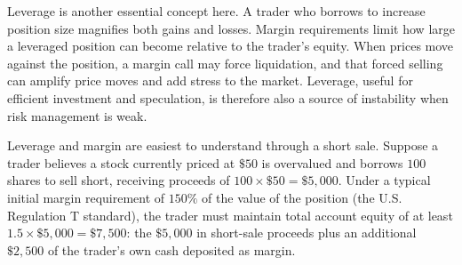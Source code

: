 \documentclass[../ai_in_finance]{subfiles}
\begin{document}
Leverage is another essential concept here. A trader who borrows to increase position size magnifies both gains and losses. Margin requirements limit how large a leveraged position can become relative to the trader's equity. When prices move against the position, a margin call may force liquidation, and that forced selling can amplify price moves and add stress to the market. Leverage, useful for efficient investment and speculation, is therefore also a source of instability when risk management is weak.

\label{sec:short-selling-margin}

Leverage and margin are easiest to understand through a short sale. Suppose a trader believes a stock currently priced at $\$50$ is overvalued and borrows $100$ shares to sell short, receiving proceeds of $100 \times \$50 = \$5{,}000$. Under a typical initial margin requirement of $150\%$ of the value of the position (the U.S. Regulation T standard), the trader must maintain total account equity of at least $1.5 \times \$5{,}000 = \$7{,}500$: the $\$5{,}000$ in short-sale proceeds plus an additional $\$2{,}500$ of the trader's own cash deposited as margin.
\end{document}
